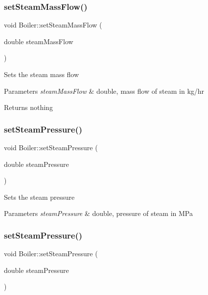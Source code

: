 \subsubsection{\texorpdfstring{set\+Steam\+Mass\+Flow()}{setSteamMassFlow()}\hspace{0.1cm}{\footnotesize\ttfamily [3/3]}}
{\footnotesize\ttfamily void Boiler\+::set\+Steam\+Mass\+Flow (\begin{DoxyParamCaption}\item[{double}]{steam\+Mass\+Flow }\end{DoxyParamCaption})}

Sets the steam mass flow 
\begin{DoxyParams}{Parameters}
{\em steam\+Mass\+Flow} & double, mass flow of steam in kg/hr \\
\hline
\end{DoxyParams}
\begin{DoxyReturn}{Returns}
nothing 
\end{DoxyReturn}
\mbox{\label{class_boiler_a0a4619ff73c9969daebe3aa66ddad6be}} 
\subsubsection{\texorpdfstring{set\+Steam\+Pressure()}{setSteamPressure()}\hspace{0.1cm}{\footnotesize\ttfamily [1/3]}}
{\footnotesize\ttfamily void Boiler\+::set\+Steam\+Pressure (\begin{DoxyParamCaption}\item[{double}]{steam\+Pressure }\end{DoxyParamCaption})}

Sets the steam pressure 
\begin{DoxyParams}{Parameters}
{\em steam\+Pressure} & double, pressure of steam in M\+Pa \\
\hline
\end{DoxyParams}
\mbox{\label{class_boiler_a0a4619ff73c9969daebe3aa66ddad6be}} 
\subsubsection{\texorpdfstring{set\+Steam\+Pressure()}{setSteamPressure()}\hspace{0.1cm}{\footnotesize\ttfamily [2/3]}}
{\footnotesize\ttfamily void Boiler\+::set\+Steam\+Pressure (\begin{DoxyParamCaption}\item[{double}]{steam\+Pressure }\end{DoxyParamCaption})}

